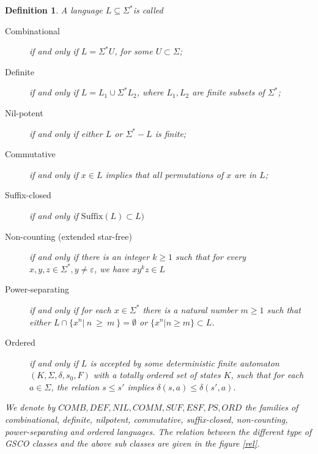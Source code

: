 \documentclass{llncs}
\newtheorem{defin}{Definition}
\newcommand{\sg}{\Sigma}
\newcommand{\ve}{\varepsilon}
\newcommand{\s}{\mathrm{Suffix}}
\begin{document}
\begin{defin}
A language $L \subseteq \sg^* $is called
\begin{description}
\item[Combinational]  if and only if  $ L = \sg^*U$, for some $ U \subset \sg$;
\item [Definite]  if and only if  $ L=L_1 \cup \sg^*L_2$, where $L_1, L_2$ are finite subsets of  $\sg^*$;
\item [Nil-potent]  if and only if  either $L$ or $\sg^*-L$ is finite;
\item [Commutative]  if and only if  $x \in L$ implies that all permutations of $x$ are in $L$;
\item [Suffix-closed]  if and only if  $\s(L) \subset L)$
\item [Non-counting (extended star-free)]  if and only if  there is an integer $k\geq1$ such that
for every $x,y,z \in \sg^*, y \neq \ve$, we have $xy^kz \in L$
\item [Power-separating]  if and only if  for each $x\in \sg^*$ there is a natural number
$m \geq 1 $
 such
that either $L \cap \{ x^n|~n ~\geq~ m~\} = \emptyset$  or $ \{x^n
|n \geq m\} \subset L$.
\item [Ordered]  if and only if  $L$ is accepted by some deterministic finite
automaton $(K,\sg,\delta, s_0, F)$ with a totally ordered set of
states $K$, such that for each $a \in \sg$, the relation  $s \leq
s'$ implies $\delta(s,a) \leq \delta(s',a)$.
\end{description}
\par We denote by $COMB,DEF,NIL,COMM,SUF,ESF,PS,ORD$ the families of combinational,
 definite, nilpotent, commutative, suffix-closed, non-counting, power-separating and
 ordered languages. The relation between the different type of GSCO classes and
 the above sub classes are given in the figure \ref{rel}.
\end{defin}
\end{document}
